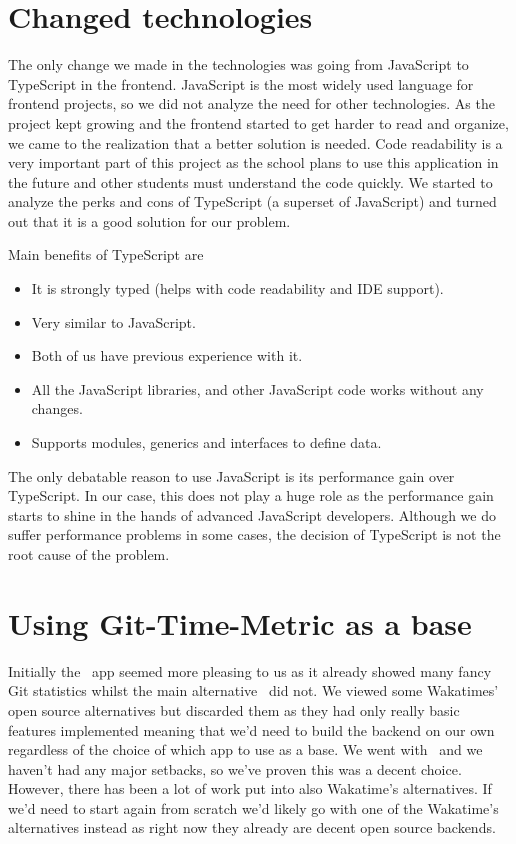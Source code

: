 \section{Changed technologies}\label{sec:changed-technologies}
The only change we made in the technologies was going from JavaScript to TypeScript in the frontend.
JavaScript is the most widely used language for frontend projects, so we did not analyze the need for other technologies.
As the project kept growing and the frontend started to get harder to read and organize, we came to the realization that a better solution is needed.
Code readability is a very important part of this project as the school plans to use this application in the future and other students must understand the code quickly.
We started to analyze the perks and cons of TypeScript (a superset of JavaScript) and turned out that it is a good solution for our problem.

Main benefits of TypeScript are
\begin{itemize}
    \item It is strongly typed (helps with code readability and IDE support).
    \item Very similar to JavaScript.
    \item Both of us have previous experience with it.
    \item All the JavaScript libraries, and other JavaScript code works without any changes.
    \item Supports modules, generics and interfaces to define data.
\end{itemize}

The only debatable reason to use JavaScript is its performance gain over TypeScript.
In our case, this does not play a huge role as the performance gain starts to shine in the hands of advanced JavaScript developers.
Although we do suffer performance problems in some cases, the decision of TypeScript is not the root cause of the problem.

\section{Using Git-Time-Metric as a base}\label{sec:using-git-time-metric-base}
Initially the~ app seemed more pleasing to us as it already showed many fancy Git statistics whilst
the main alternative~ did not.
We viewed some Wakatimes' open source alternatives but discarded them as they had only really basic features implemented meaning that
we'd need to build the backend on our own regardless of the choice of which app to use as a base.
We went with~ and we haven't had any major setbacks, so we've proven this was a decent choice.
However, there has been a lot of work put into also Wakatime's alternatives.
If we'd need to start again from scratch we'd likely go with one of the Wakatime's alternatives instead as right now
they already are decent open source backends.

